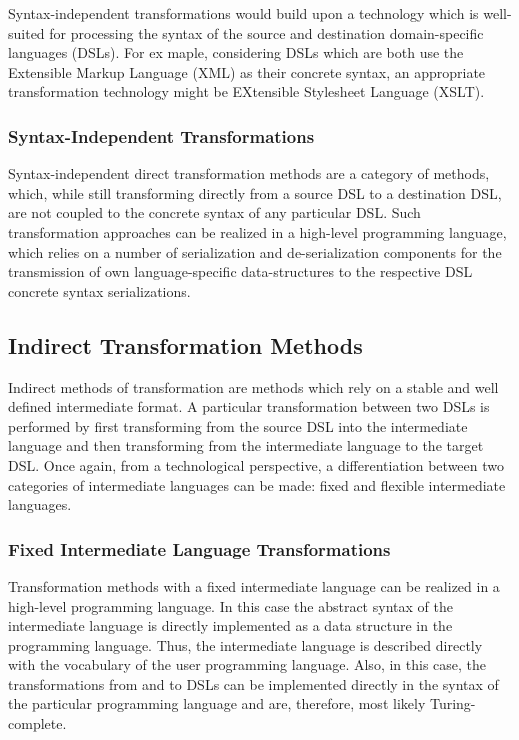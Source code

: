 Syntax-independent transformations would build upon a technology which is well-suited for processing the syntax of the source and destination domain-specific languages (DSLs). For ex maple, considering DSLs which are both use the Extensible Markup Language (XML) as their concrete syntax, an appropriate transformation technology might be EXtensible Stylesheet Language (XSLT).

\subsubsection{Syntax-Independent Transformations}

Syntax-independent direct transformation methods are a category of methods, which, while still transforming directly from a source DSL to a destination DSL, are not coupled to the concrete syntax of any particular DSL. Such transformation approaches can be realized in a high-level programming language, which relies on a number of serialization and de-serialization components for the transmission of own language-specific data-structures to the respective DSL concrete syntax serializations.

\subsection{Indirect Transformation Methods}

Indirect methods of transformation are methods which rely on a stable and well defined intermediate format. A particular transformation between two DSLs is performed by first transforming from the source DSL into the intermediate language and then transforming from the intermediate language to the target DSL. Once again, from a technological perspective, a differentiation between two categories of intermediate languages can be made: fixed and flexible intermediate languages.

\subsubsection{Fixed Intermediate Language Transformations}

Transformation methods with a fixed intermediate language can be realized in a high-level programming language. In this case the abstract syntax of the intermediate language is directly implemented as a data structure in the programming language. Thus, the intermediate language is described directly with the vocabulary of the user programming language. Also, in this case, the transformations from and to DSLs can be implemented directly in the syntax of the particular programming language and are, therefore, most likely Turing-complete.

